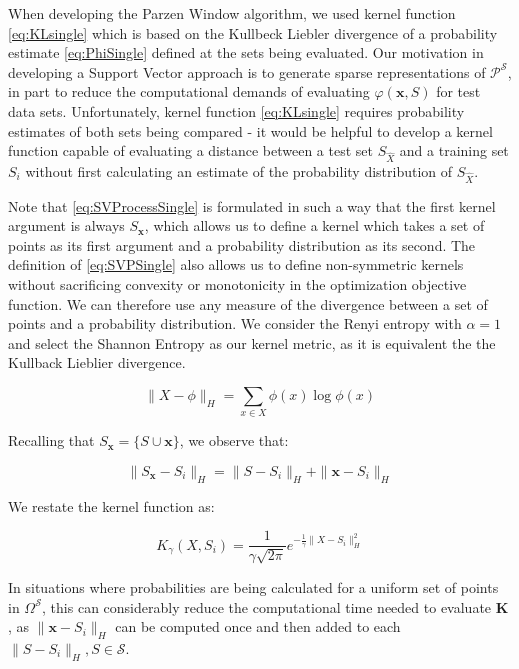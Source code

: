 \documentclass[10pt]{article}
\begin{document}
When developing the Parzen Window algorithm, we used kernel function \ref{eq:KLsingle} which is based on the Kullbeck Liebler divergence of a probability estimate \ref{eq:PhiSingle} defined at the sets being evaluated.  Our motivation in developing a Support Vector approach is to generate sparse representations of \( \mathcal{P}^{\mathcal{S}} \), in part to reduce the computational demands of evaluating \( \varphi( \mathbf{x}, S) \) for test data sets.  Unfortunately, kernel function \ref{eq:KLsingle} requires probability estimates of both sets being compared - it would be helpful to develop a kernel function capable of evaluating a distance between a test set \( S_{\hat{X}} \) and a training set \( S_i \) without first calculating an estimate of the probability distribution of \( S_{\hat{X}} \).

Note that \ref{eq:SVProcessSingle} is formulated in such a way that the first kernel argument is always \( S_{\mathbf{x}} \), which allows us to define a kernel which takes a set of points as its first argument and a probability distribution as its second.  The definition of \ref{eq:SVPSingle} also allows us to define non-symmetric kernels without sacrificing convexity or monotonicity in the optimization objective function.  We can therefore use any measure of the divergence between a set of points and a probability distribution.  We consider the Renyi entropy with \( \alpha = 1 \) and select the Shannon Entropy as our kernel metric, as it is equivalent the the Kullback Lieblier divergence.

\begin{equation}
\| X - \phi \|_{H} = \sum_{x \in X} \phi(x) \log \phi(x)
\end{equation}

Recalling that \( S_\mathbf{x} = \{ S \cup \mathbf{x} \} \), we observe that:

\begin{equation}
\| S_{\mathbf{x}} - S_i \|_{H} = \| S - S_i \|_{H} + \| \mathbf{x} - S_i \|_{H}
\end{equation}

We restate the kernel function as:

\begin{equation}
K_\gamma( X, S_i ) =  \frac{1}{\gamma \sqrt{2\pi} } e^{-\frac{1}{\gamma} \|X - S_i \|_{H}^2}
\end{equation}

In situations where probabilities are being calculated for a uniform set of points in \( \Omega^{\mathcal{S}} \), this can considerably reduce the computational time needed to evaluate \( \mathbf{K} \), as \( \|\mathbf{x} - S_i \|_H \) can be computed once and then added to each \( \|S - S_i\|_H, S \in \mathcal{S} \).
\end{document}
